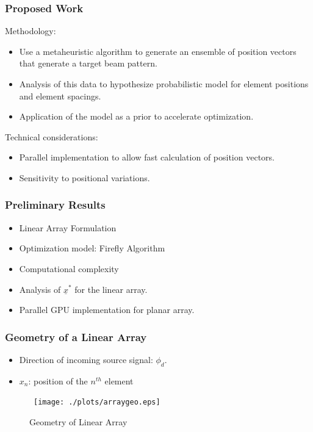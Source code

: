 \documentclass[...]{beamer}
\begin{document}
\begin{frame}
  \frametitle{Proposed Work}

  Methodology:
  \begin{itemize}
    \item Use a metaheuristic algorithm to generate an ensemble of position vectors that generate a target beam pattern.
    \item Analysis of this data to hypothesize probabilistic model for element positions and element spacings.
    \item Application of the model as a prior to accelerate optimization.
  \end{itemize}
  \vspace{3mm}
  Technical considerations:
  \begin{itemize}
    \item Parallel implementation to allow fast calculation of position vectors.
    \item Sensitivity to positional variations.
  \end{itemize}

\end{frame}

\begin{frame}
  \frametitle{Preliminary Results}
  
  \begin{itemize}
    \item Linear Array Formulation
    \item Optimization model: Firefly Algorithm
    \item Computational complexity
    \item Analysis of $\underline{x}^*$ for the linear array.
    \item Parallel GPU implementation for planar array.
  \end{itemize}

\end{frame}



\begin{frame}
  \frametitle{Geometry of a Linear Array}

  \begin{itemize}
    \item Direction of incoming source signal: $\phi_d$.
    \item $x_n$: position of the $n^{th}$ element
  \end{itemize}
  
  \begin{figure} 
    \centerline{\hbox{ \hspace{0.0in}
        \texttt{[image: ./plots/arraygeo.eps]}
      }
    }
    \caption {Geometry of Linear Array}\label{fig:arraygeo}
  \end{figure}

\end{frame}
\end{document}
